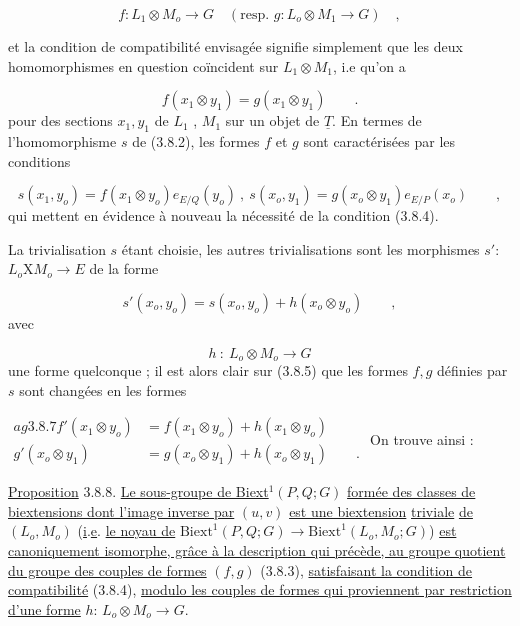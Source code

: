 \begin{equation}\tag{3.8.3}
f : L_1 \otimes M_o \longrightarrow G \quad (\text{resp. } g: L_o \otimes M_1 \longrightarrow G) \quad ,
\end{equation}

et la condition de compatibilité envisagée signifie simplement que les deux homomorphismes en question coïncident sur $L_1 \otimes M_1$, i.e qu'on a

\begin{equation}\tag{3.8.4}
f(x_1 \otimes y_1) = g(x_1 \otimes y_1) \qquad .
\end{equation}
pour des sections $x_1,y_1$ de $L_1$ , $M_1$ sur un objet de $\underline{T}$. En termes de l'homomorphisme $s$ de (3.8.2), les formes $f$ et $g$ sont caractérisées  par les conditions

\begin{equation}\tag{3.8.5}
s(x_1,y_o) = f(x_1 \otimes y_o) e_{E/Q}(y_o) \ , \ s(x_o,y_1) = g(x_o \otimes y_1) e_{E/P}(x_o) \qquad ,
\end{equation}
qui mettent en évidence à nouveau la nécessité de la condition (3.8.4).

La trivialisation $s$ étant choisie, les autres trivialisations sont les morphismes $s'$: $L_o \mathrm{X} M_o \longrightarrow E$ de la forme

\begin{equation}\tag{3.8.6}
s'(x_o,y_o) = s(x_o,y_o) + h(x_o \otimes y_o) \qquad ,
\end{equation}
avec

\begin{equation*}
h \ : \ L_o \otimes M_o \longrightarrow G
\end{equation*}
une forme quelconque ; il est alors clair sur (3.8.5) que les formes $f,g$ définies par $s$ sont changées en les formes

$\begin{aligned}	ag{3.8.7} f'(x_1 \otimes y_o) &= f(x_1 \otimes y_o) + h(x_1 \otimes y_o) \\ g'(x_o \otimes y_1) &= g(x_o \otimes y_1) + h(x_o \otimes y_1) \qquad . \end{aligned}$
On trouve ainsi :

\underline{Proposition} 3.8.8. \underline{Le sous-groupe de Biext}$^1(P,Q;G)$ \underline{formée des classes de biextensions dont l'image inverse par} $(u,v)$ \underline{est une biextension} \underline{triviale} \underline{de} $(L_o,M_o)$ (\underline{i}.\underline{e}. \underline{le noyau de} $\mathrm{Biext}^1(P,Q;G) \longrightarrow \mathrm{Biext}^1(L_o,M_o;G)$) \underline{est canoniquement isomorphe, grâce à la description qui précède, au groupe quotient}
\underline{du groupe des couples de formes} $(f,g)$ (3.8.3), \underline{satisfaisant la condition de compatibilité} (3.8.4), \underline{modulo les couples de formes qui proviennent par restriction d'une forme} $h$: $L_o \otimes M_o \longrightarrow G$.

